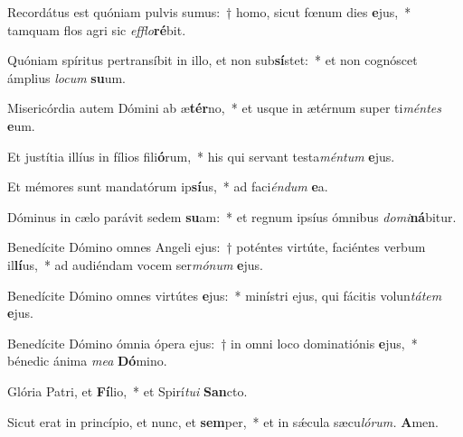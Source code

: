 \item Recordátus est quóniam pulvis sumus:~† homo, sicut fœnum dies \textbf{e}jus,~* tamquam flos agri sic \textit{efflo}\textbf{ré}bit.
\item Quóniam spíritus pertransíbit in illo, et non sub\textbf{sí}stet:~* et non cognóscet ámplius \textit{locum} \textbf{su}um.
\item Misericórdia autem Dómini ab æ\textbf{tér}no,~* et usque in ætérnum super ti\textit{méntes} \textbf{e}um.
\item Et justítia illíus in fílios fili\textbf{ó}rum,~* his qui servant testa\textit{méntum} \textbf{e}jus.
\item Et mémores sunt mandatórum ip\textbf{sí}us,~* ad faci\textit{éndum} \textbf{e}a.
\item Dóminus in cælo parávit sedem \textbf{su}am:~* et regnum ipsíus ómnibus \textit{domi}\textbf{ná}bitur.
\item Benedícite Dómino omnes Angeli ejus:~† poténtes virtúte, faciéntes verbum il\textbf{lí}us,~* ad audiéndam vocem ser\textit{mónum} \textbf{e}jus.
\item Benedícite Dómino omnes virtútes \textbf{e}jus:~* minístri ejus, qui fácitis volun\textit{tátem} \textbf{e}jus.
\item Benedícite Dómino ómnia ópera ejus:~† in omni loco dominatiónis \textbf{e}jus,~* bénedic ánima \textit{mea} \textbf{Dó}mino.
\item Glória Patri, et \textbf{Fí}lio,~* et Spirí\hspace{0.03em}\textit{tui} \textbf{San}cto.
\item Sicut erat in princípio, et nunc, et \textbf{sem}per,~* et in sǽcula sæcu\hspace{0.03em}\textit{lórum.} \textbf{A}men.